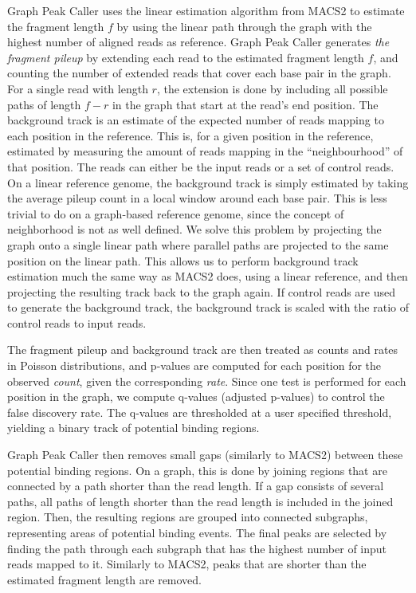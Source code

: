 \documentclass[10pt,letterpaper]{article}
\begin{document}
Graph Peak Caller uses the linear estimation algorithm from MACS2 to estimate the fragment length $f$ by using the linear path through the graph with the highest number of aligned reads as reference.
Graph Peak Caller generates \emph{the fragment pileup} by extending each read to the estimated fragment length $f$, and counting the number of extended reads that cover each base pair in the graph. For a single read with length $r$, the extension is done by including all possible paths of length $f-r$ in the graph that start at the read’s end position. 
The background track is an estimate of the expected number of reads mapping to each position in the reference. This is, for a given position in the reference, estimated by measuring the amount of reads mapping in the “neighbourhood” of that position. The reads can either be the input reads or a set of control reads. On a linear reference genome, the background track is simply estimated by taking the average pileup count in a local window around each base pair. This is less trivial to do on a graph-based reference genome, since the concept of neighborhood is not as well defined. We solve this problem by projecting the graph onto a single linear path where parallel paths are projected to the same position on the linear path. This allows us to perform background track estimation much the same way as MACS2 does, using a linear reference, and then projecting the resulting track back to the graph again. If control reads are used to generate the background track, the background track is scaled with the ratio of control reads to input reads.
	
The fragment pileup and background track are then treated as counts and rates in Poisson distributions, and p-values are computed for each position for the observed \emph{count}, given the corresponding \emph{rate}. Since one test is performed for each position in the graph, we compute q-values (adjusted p-values) to control the false discovery rate. The q-values are thresholded at a user specified threshold, yielding a binary track of potential binding regions. 

Graph Peak Caller then removes small gaps (similarly to MACS2) between these potential binding regions.
On a graph, this is done by joining regions that are connected by a path shorter than the read length.
If a gap consists of several paths, all paths of length shorter than the read length is included in the joined region.
Then, the resulting regions are grouped into connected subgraphs, representing areas of potential binding events. The final peaks are selected by finding the path through each subgraph that has the highest number of input reads mapped to it. Similarly to MACS2, peaks that are shorter than the estimated fragment length are removed. 
\end{document}
